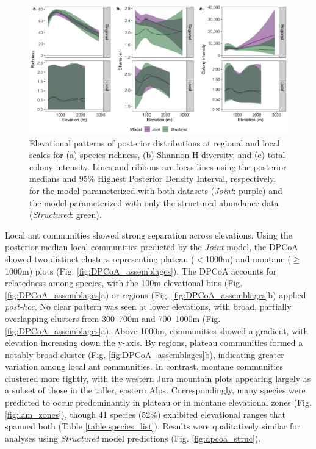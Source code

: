 \documentclass[preprint,final,times,12pt,3p]{elsarticle}
\begin{document}
\begin{figure}
	\centering\includegraphics[width=6in]{../../../ms/1_Ecography/1/figs/el_patterns.png}
	\caption{\label{fig:el_patterns} Elevational patterns of posterior distributions at regional and local scales for (a) species richness, (b) Shannon H diversity, and (c) total colony intensity. Lines and ribbons are loess lines using the posterior medians and 95\% Highest Posterior Density Interval, respectively, for the model parameterized with both datasets (\emph{Joint}: purple) and the model parameterized with only the structured abundance data (\emph{Structured}: green). }
\end{figure}


Local ant communities showed strong separation across elevations. Using the posterior median local communities predicted by the \emph{Joint} model, the DPCoA showed two distinct clusters representing plateau ($<$1000m) and montane ($\geq$1000m) plots (Fig. \ref{fig:DPCoA_assemblages}). The DPCoA accounts for relatedness among species, with the 100m elevational bins (Fig. \ref{fig:DPCoA_assemblages}a) or regions (Fig. \ref{fig:DPCoA_assemblages}b) applied \emph{post-hoc}. No clear pattern was seen at lower elevations, with broad, partially overlapping clusters from 300–700m and 700–1000m (Fig. \ref{fig:DPCoA_assemblages}a). Above 1000m, communities showed a gradient, with elevation increasing down the y-axis. By regions, plateau communities formed a notably broad cluster (Fig. \ref{fig:DPCoA_assemblages}b), indicating greater variation among local ant communities. In contrast, montane communities clustered more tightly, with the western Jura mountain plots appearing largely as a subset of those in the taller, eastern Alps. Correspondingly, many species were predicted to occur predominantly in plateau or in montane elevational zones (Fig. \ref{fig:lam_zones}), though 41 species (52\%) exhibited elevational ranges that spanned both (Table \ref{table:species_list}). Results were qualitatively similar for analyses using \emph{Structured} model predictions (Fig. \ref{fig:dpcoa_struc}).
\end{document}
